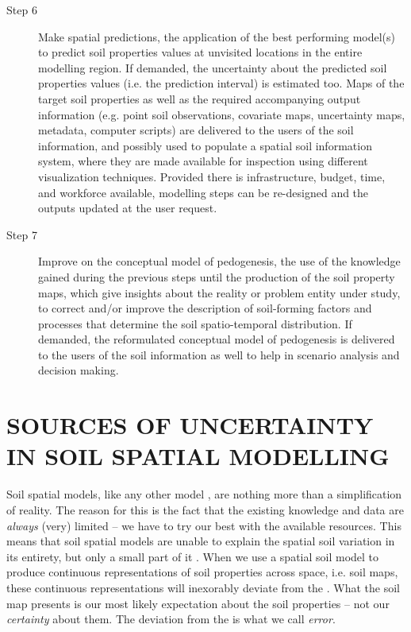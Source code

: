 \begin{description}
\item[Step 6] Make spatial predictions, the application of the best performing model(s) to predict soil 
properties values at unvisited locations in the entire modelling region. If demanded, the uncertainty about 
the predicted soil properties values (i.e. the prediction interval) is estimated too. Maps of the target soil 
properties as well as the required accompanying output information (e.g. point soil observations, covariate 
maps, uncertainty maps, metadata, computer scripts) are delivered to the users of the soil information, and 
possibly used to populate a spatial soil information system, where they are made available for inspection 
using different visualization techniques. Provided there is infrastructure, budget, time, and workforce 
available, modelling steps can be re-designed and the outputs updated at the user request.

\item[Step 7] Improve on the conceptual model of pedogenesis, the use of the knowledge gained during the 
previous steps until the production of the soil property maps, which give insights about the reality or problem
entity under study, to correct and/or improve the description of soil-forming factors and processes that 
determine the soil spatio-temporal distribution. If demanded, the reformulated conceptual model of pedogenesis 
is delivered to the users of the soil information as well to help in scenario analysis and decision making.
\end{description}

\section{SOURCES OF UNCERTAINTY IN SOIL SPATIAL MODELLING}

Soil spatial models, like any other model \cite{Box1976}, are nothing more than a simplification of reality. 
The reason for this is the fact that the existing knowledge and data are \emph{always} (very) limited -- we 
have to try our best with the available resources. This means that soil spatial models are unable to explain 
the spatial soil variation in its entirety, but only a small part of it \cite{Heuvelink1998a, Legros2006}. When 
we use a spatial soil model to produce continuous representations of soil properties across space, i.e. soil 
maps, these continuous representations will inexorably deviate from the . What the soil map presents 
is our most likely expectation about the soil properties -- not our \emph{certainty} about them. The deviation 
from the  is what we call \emph{error}.

